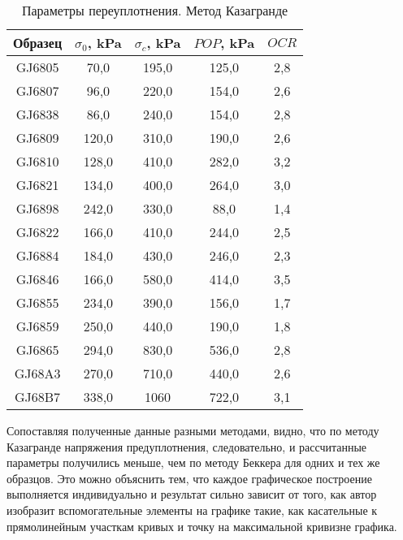   \begin{table}[]
    \centering
    \begin{threeparttable}
      \caption{Параметры переуплотнения. Метод Казагранде}\label{tab:komp1}
    \begin{tabular}{|c|c|c|c|c|}
    \hline
    Образец  & $\sigma_0$, \si{\kilo\Pa} & $\sigma_c$, \si{\kilo\Pa} & $POP$, \si{\kilo\Pa}   & $OCR$ \\ \hline
    GJ6805 & 70,0  & 195,0 & 125,0 & 2,8 \\ \hline
    GJ6807 & 96,0  & 220,0 & 154,0 & 2,6 \\ \hline
    GJ6838 & 86,0  & 240,0 & 154,0 & 2,8 \\ \hline
    GJ6809 & 120,0 & 310,0 & 190,0 & 2,6 \\ \hline
    GJ6810 & 128,0 & 410,0 & 282,0 & 3,2 \\ \hline
    GJ6821 & 134,0 & 400,0 & 264,0 & 3,0 \\ \hline
    GJ6898 & 242,0 & 330,0 & 88,0  & 1,4 \\ \hline
    GJ6822 & 166,0 & 410,0 & 244,0 & 2,5 \\ \hline
    GJ6884 & 184,0 & 430,0 & 246,0 & 2,3 \\ \hline
    GJ6846 & 166,0 & 580,0 & 414,0 & 3,5 \\ \hline
    GJ6855 & 234,0 & 390,0 & 156,0 & 1,7 \\ \hline
    GJ6859 & 250,0 & 440,0 & 190,0 & 1,8 \\ \hline
    GJ6865 & 294,0 & 830,0 & 536,0 & 2,8 \\ \hline
    GJ68A3 & 270,0 & 710,0 & 440,0 & 2,6 \\ \hline
    GJ68B7 & 338,0 & 1060  & 722,0 & 3,1 \\ \hline
    \end{tabular}
  \end{threeparttable}
    \end{table}

Сопоставляя полученные данные разными методами, 
видно, что по методу Казагранде напряжения предуплотнения, 
следовательно, и рассчитанные параметры получились 
меньше, чем по методу Беккера для одних и тех же образцов.
Это можно объяснить тем, что каждое графическое построение 
выполняется индивидуально и результат сильно зависит от 
того, как автор изобразит вспомогательные элементы 
на графике такие, как касательные к прямолинейным участкам 
кривых и точку на максимальной кривизне графика.
